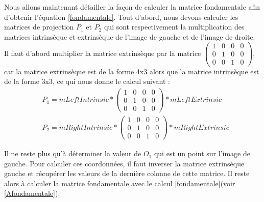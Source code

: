 \documentclass[a4paper,10pt]{article}
\begin{document}
Nous allons maintenant détailler la façon de calculer la matrice fondamentale afin
d'obtenir l'équation \eqref{fondamentale}. Tout d'abord, nous devons calculer
les matrices de projection $P_1$ et $P_2$ qui sont respectivement la multiplication des matrices
intrinsèque et extrinsèque de l'image de gauche et de l'image de droite. Il faut
d'abord multiplier la matrice extrinsèque par la matrice $\begin{pmatrix} 1&0&0&0\\0&1&0&0\\0&0&1&0\end{pmatrix}$,
car la matrice extrinsèque est de la forme 4x3 alors que la matrice intrinsèque est de la forme
3x3, ce qui nous donne le calcul suivant :
\begin{align}
 &P_1 = mLeftIntrinsic * \begin{pmatrix} 1&0&0&0\\0&1&0&0\\0&0&1&0\end{pmatrix} * mLeftExtrinsic\\
 &P_2 = mRightIntrinsic * \begin{pmatrix} 1&0&0&0\\0&1&0&0\\0&0&1&0\end{pmatrix} * mRightExtrinsic
 \label{matriceP}
\end{align}

Il ne reste plus qu'à déterminer la valeur de $O_1$ qui est un point sur l'image de gauche.
Pour calculer ces coordonnées, il faut inverser la matrice extrinsèque gauche et récupérer
les valeurs de la dernière colonne de cette matrice. Il reste alors à calculer la matrice
fondamentale avec le calcul \eqref{fondamentale}(voir \ref{Afondamentale}).
\end{document}
